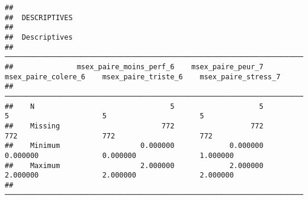 \documentclass[
]{article}
\begin{document}
\begin{verbatim}
## 
##  DESCRIPTIVES
## 
##  Descriptives                                                                                                                     
##  ──────────────────────────────────────────────────────────────────────────────────────────────────────────────────────────────── 
##               msex_paire_moins_perf_6    msex_paire_peur_7    msex_paire_colere_6    msex_paire_triste_6    msex_paire_stress_7   
##  ──────────────────────────────────────────────────────────────────────────────────────────────────────────────────────────────── 
##    N                                5                    5                      5                      5                      5   
##    Missing                        772                  772                    772                    772                    772   
##    Minimum                   0.000000             0.000000               0.000000               0.000000               1.000000   
##    Maximum                   2.000000             2.000000               2.000000               2.000000               2.000000   
##  ────────────────────────────────────────────────────────────────────────────────────────────────────────────────────────────────
\end{verbatim}
\end{document}
